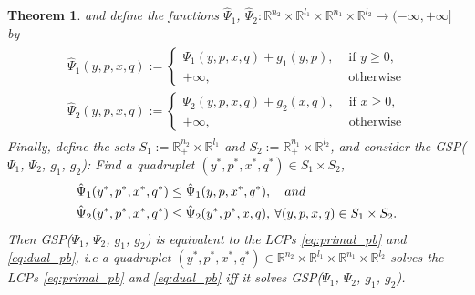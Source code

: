 \documentclass[a4paper,9pt]{extarticle}
\newtheorem{theorem}{Theorem}
\begin{document}
\begin{theorem}
and define the functions $\hat{\Psi}_1$, $\hat{\Psi}_2:
\mathbb{R}^{n_2} \times \mathbb{R}^{l_1} \times \mathbb{R}^{n_1}
\times \mathbb{R}^{l_2} \rightarrow (-\infty, +\infty]$ by
\begin{eqnarray}
  \begin{aligned}
    \hat{\Psi}_1(y, p, x, q) :=\begin{cases}
    \Psi_1(y, p, x, q)+ g_1(y, p), &\mbox{ if }y \ge 0,\\
    +\infty, &\mbox{ otherwise}\end{cases}\\
    \hat{\Psi}_2(y, p, x, q) :=\begin{cases}
    \Psi_2(y, p, x, q)+ g_2(x, q), &\mbox{ if }x \ge 0,\\
    +\infty, &\mbox{ otherwise}\end{cases}
  \end{aligned}
\end{eqnarray}
Finally, define the sets $S_1 := \mathbb{R}^{n_2}_+ \times
\mathbb{R}^{l_1}$ and $S_2 := \mathbb{R}^{n_1}_+ \times
\mathbb{R}^{l_2}$, and consider the GSP($\Psi_1$, $\Psi_2$, $g_1$,
$g_2$): Find a quadruplet $(y^*,p^*, x^*, q^*) \in S_1 \times S_2$,
\begin{eqnarray}
  \begin{split}
    &\hat{\Psi}_1(y^*, p^*, x^*, q^*) \le \hat{\Psi}_1(y, p, x^*,
    q^*),\hspace{1em}and\\
    &\hat{\Psi}_2(y^*, p^*, x^*, q^*)
    \le \hat{\Psi}_2(y^*, p^*, x, q),\hspace{.21em} \forall (y,p, x, q)
    \in S_1 \times S_2.
  \label{eq:unconstrained_pb}
\end{split}
\end{eqnarray}
\label{thm:pd}
Then GSP($\Psi_1$,
  $\Psi_2$, $g_1$, $g_2$) is equivalent to the LCPs
  \eqref{eq:primal_pb} and \eqref{eq:dual_pb}, i.e
a quadruplet $(y^*,p^*, x^*, q^*) \in \mathbb{R}^{n_2}
  \times \mathbb{R}^{l_1} \times \mathbb{R}^{n_1} \times
  \mathbb{R}^{l_2}$ solves the LCPs
  \eqref{eq:primal_pb} and \eqref{eq:dual_pb} iff it solves
  GSP($\Psi_1$, $\Psi_2$, $g_1$, $g_2$). 
  \label{thm:pd}
\end{theorem}
\end{document}
